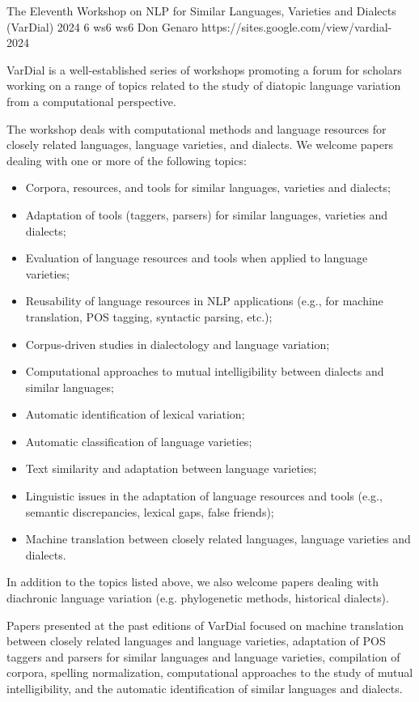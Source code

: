 \begin{wsschedulenolist}
{The Eleventh Workshop on NLP for Similar Languages, Varieties and Dialects (VarDial) 2024}
{6}
{ws6}
{ws6}
{Don Genaro}
{https://sites.google.com/view/vardial-2024}

VarDial is a well-established series of workshops promoting a forum for scholars working on a range of topics related to the study of diatopic language variation from a computational perspective.

The workshop deals with computational methods and language resources for closely related languages, language varieties, and dialects. We welcome papers dealing with one or more of the following topics:

\begin{itemize}
    \setlength{\itemsep}{-0.3ex}
    \item Corpora, resources, and tools for similar languages, varieties and dialects;
    \item Adaptation of tools (taggers, parsers) for similar languages, varieties and dialects;
    \item Evaluation of language resources and tools when applied to language varieties;
    \item Reusability of language resources in NLP applications (e.g., for machine translation, POS tagging, syntactic parsing, etc.);
    \item Corpus-driven studies in dialectology and language variation;
    \item Computational approaches to mutual intelligibility between dialects and similar languages;
    \item Automatic identification of lexical variation;
    \item Automatic classification of language varieties;
    \item Text similarity and adaptation between language varieties;
    \item Linguistic issues in the adaptation of language resources and tools (e.g., semantic discrepancies, lexical gaps, false friends);
    \item Machine translation between closely related languages, language varieties and dialects.
\end{itemize}

In addition to the topics listed above, we also welcome papers dealing with diachronic language variation (e.g. phylogenetic methods, historical dialects).

Papers presented at the past editions of VarDial focused on machine translation between closely related languages and language varieties, adaptation of POS taggers and parsers for similar languages and language varieties, compilation of corpora, spelling normalization, computational approaches to the study of mutual intelligibility, and the automatic identification of similar languages and dialects.



\end{wsschedulenolist}

